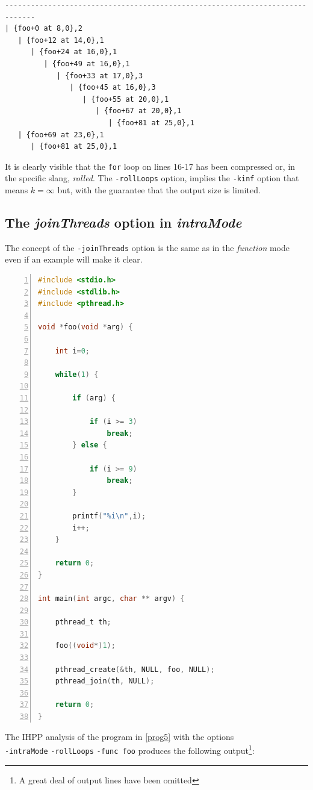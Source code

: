 \documentclass[a4paper,10pt]{report}
\begin{document}
\begin{lstlisting}[label=out10, caption={an output of IHPP with rollLoops option}]
-----------------------------------------------------------------------------
| {foo+0 at 8,0},2
   | {foo+12 at 14,0},1
      | {foo+24 at 16,0},1
         | {foo+49 at 16,0},1
            | {foo+33 at 17,0},3
               | {foo+45 at 16,0},3
                  | {foo+55 at 20,0},1
                     | {foo+67 at 20,0},1
                        | {foo+81 at 25,0},1
   | {foo+69 at 23,0},1
      | {foo+81 at 25,0},1
\end{lstlisting}

It is clearly visible that the \verb|for| loop on lines 16-17 
has been compressed or, in the specific slang, \emph{rolled}.
The \verb|-rollLoops| option, implies the \verb|-kinf| option
that means $k=\infty$ but, with the guarantee that 
the output size is limited.

\subsection{The \emph{joinThreads} option in \emph{intraMode}}

The concept of the \verb|-joinThreads| option is the same as in the 
\emph{function} mode even if an example will make it clear. 

\begin{lstlisting}[language=C, 
	caption={prog5.c, an example program}, label=prog5, frame=leftline, numbers=left]
#include <stdio.h>
#include <stdlib.h>
#include <pthread.h>

void *foo(void *arg) {

	int i=0;

	while(1) {

		if (arg) {
		
			if (i >= 3)
				break;	
		} else {

			if (i >= 9)
				break;
		}
		
		printf("%i\n",i);
		i++;
	}

	return 0;
}

int main(int argc, char ** argv) {

	pthread_t th;
	
	foo((void*)1);

	pthread_create(&th, NULL, foo, NULL);
	pthread_join(th, NULL);

	return 0;
}

\end{lstlisting}

\noindent
The IHPP analysis of the program in \cref{prog5} with the options\\\verb|-intraMode| \verb|-rollLoops| \verb|-func foo| produces the following output\footnote{A great deal of output lines have been omitted}:
\end{document}

